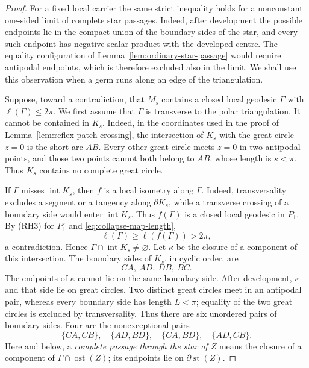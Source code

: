 \documentclass[12pt,a4paper]{article}
\theoremstyle{definition}
\begin{document}
\begin{proof}
For a fixed local carrier the same strict inequality holds for a nonconstant
one-sided limit of complete star passages.  Indeed, after development the
possible endpoints lie in the compact union of the boundary sides of the
star, and every such endpoint has negative scalar product with the developed
centre.  The equality configuration of Lemma~\ref{lem:ordinary-star-passage}
would require antipodal endpoints, which is therefore excluded also in the
limit.  We shall use this observation when a germ runs along an edge of the
triangulation.

Suppose, toward a contradiction, that \(M_s\) contains a closed local geodesic
\(\Gamma\) with \(\ell(\Gamma)\le2\pi\).  We first assume that \(\Gamma\) is
transverse to the polar triangulation.  It cannot be contained in \(K_s\).
Indeed, in the coordinates used in the proof of
Lemma~\ref{lem:reflex-patch-crossing}, the intersection of \(K_s\) with the
great circle \(z=0\) is the short arc \(AB\).  Every other great circle meets
\(z=0\) in two antipodal points, and those two points cannot both belong to
\(AB\), whose length is \(s<\pi\).  Thus \(K_s\) contains no complete great
circle.

If \(\Gamma\) misses \(\operatorname{int}K_s\), then \(f\) is a local
isometry along \(\Gamma\).  Indeed, transversality excludes a segment or a
tangency along \(\partial K_s\), while a transverse crossing of a boundary
side would enter \(\operatorname{int}K_s\).  Thus \(f(\Gamma)\) is a closed
local geodesic in
\(P_1^\circ\).  By \textup{(RH3)} for \(P_1^\circ\) and
\eqref{eq:collapse-map-length},
\[
        \ell(\Gamma)\ge \ell(f(\Gamma))>2\pi,
\]
a contradiction.  Hence
\(\Gamma\cap\operatorname{int}K_s\ne\varnothing\).  Let \(\kappa\) be the
closure of a component of this intersection.  The boundary sides of \(K_s\),
in cyclic order, are
\[
        CA,\ AD,\ DB,\ BC.
\]
The endpoints of \(\kappa\) cannot lie on the same boundary side.  After
development, \(\kappa\) and that side lie on great circles.  Two distinct
great circles meet in an antipodal pair, whereas every boundary side has
length \(L<\pi\); equality of the two great circles is excluded by
transversality.  Thus there are six unordered pairs of boundary sides.  Four
are the nonexceptional pairs
\begin{equation}\label{eq:nonexceptional-boundary-pairs}
 \{CA,CB\},\quad \{AD,BD\},\quad
 \{CA,BD\},\quad \{AD,CB\}.
\end{equation}
Here and below, a \emph{complete passage through the star of \(Z\)} means the
closure of a component of
\(\Gamma\cap\operatorname{ost}(Z)\); its endpoints lie on
\(\partial\operatorname{st}(Z)\).


\end{proof}
\end{document}
